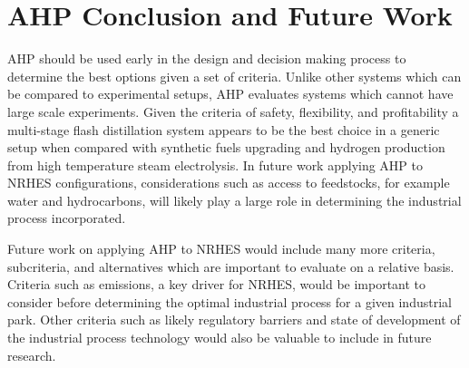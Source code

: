 \newpage
\section{AHP Conclusion and Future Work}

AHP should be used early in the design and decision making process to determine the best options given a set of criteria. Unlike other systems which can be compared to experimental setups, AHP evaluates systems which cannot have large scale experiments. Given the criteria of safety, flexibility, and profitability a multi-stage flash distillation system appears to be the best choice in a generic setup when compared with synthetic fuels upgrading and hydrogen production from high temperature steam electrolysis. In future work applying AHP to NRHES configurations, considerations such as access to feedstocks, for example water and hydrocarbons, will likely play a large role in determining the industrial process incorporated.

 Future work on applying AHP to NRHES would include many more criteria, subcriteria, and alternatives which are important to evaluate on a relative basis.  Criteria such as emissions, a key driver for NRHES, would be important to consider before determining the optimal industrial process for a given industrial park. Other criteria such as likely regulatory barriers and state of development of the industrial process technology would also be valuable to include in future research.
